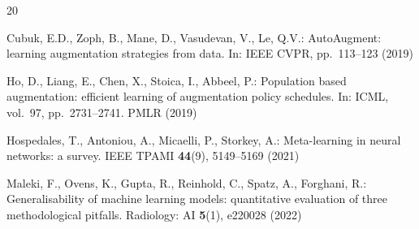 \documentclass[runningheads]{llncs}
\begin{document}

\begin{thebibliography}{20}


Cubuk, E.D., Zoph, B., Mane, D., Vasudevan, V., Le, Q.V.: AutoAugment:
learning augmentation strategies from data. In: IEEE CVPR, pp.~113--123 (2019)

Ho, D., Liang, E., Chen, X., Stoica, I., Abbeel, P.: Population based
augmentation: efficient learning of augmentation policy schedules. In:
ICML, vol.~97, pp.~2731--2741. PMLR (2019)

Hospedales, T., Antoniou, A., Micaelli, P., Storkey, A.: Meta-learning
in neural networks: a survey. IEEE TPAMI \textbf{44}(9), 5149--5169 (2021)

Maleki, F., Ovens, K., Gupta, R., Reinhold, C., Spatz, A., Forghani,
R.: Generalisability of machine learning models: quantitative evaluation
of three methodological pitfalls. Radiology: AI \textbf{5}(1), e220028 (2022)


\end{thebibliography}
\end{document}
